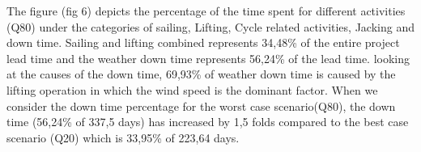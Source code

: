 The figure (fig 6) depicts the percentage of the time spent for different activities (Q80) under the categories of sailing, Lifting, Cycle related activities, Jacking and down time. Sailing and lifting combined represents 34,48\% of the entire project lead time and the weather down time represents 56,24\% of the lead time. looking at the causes of the down time, 69,93\% of weather down time is caused by the lifting operation in which the wind speed is the dominant factor. When we consider the down time percentage for the worst case scenario(Q80), the down time (56,24\% of 337,5 days) has increased by 1,5 folds compared to the best case scenario (Q20) which is 33,95\% of 223,64 days.